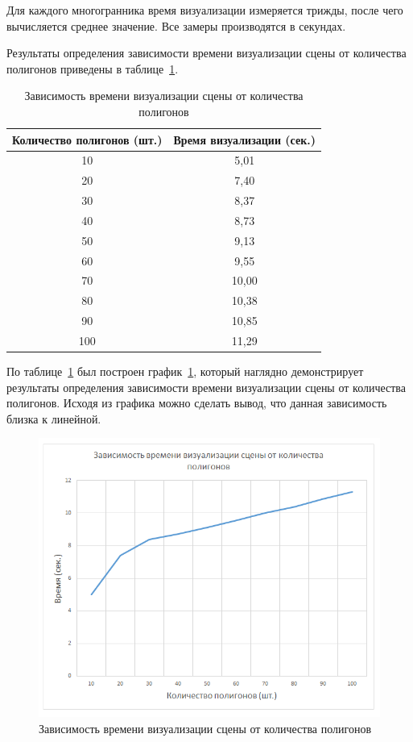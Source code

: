 Для каждого многогранника время визуализации измеряется трижды, после чего вычисляется среднее значение. Все замеры производятся в секундах.

Результаты определения зависимости времени визуализации сцены от количества полигонов приведены в таблице~\ref{tbl:research1}.

\begin{table}[h]
	\centering
	\caption{Зависимость времени визуализации сцены от количества полигонов}
	\begin{tabular}{|c|c|}
		\hline
		\textbf{Количество полигонов (шт.)} & \textbf{Время визуализации (сек.)} \\
		\hline
		10  & 5,01 \\
		20  & 7,40 \\
		30  & 8,37 \\
		40  & 8,73 \\
		50  & 9,13 \\
		60  & 9,55 \\
		70  & 10,00 \\
		80  & 10,38 \\
		90  & 10,85 \\
		100 & 11,29 \\
		\hline
	\end{tabular}
	\label{tbl:research1}
\end{table}

По таблице~\ref{tbl:research1} был построен график~\ref{fig:research1}, который наглядно демонстрирует результаты определения зависимости времени визуализации сцены от количества полигонов. Исходя из графика можно сделать вывод, что данная зависимость близка к линейной.

\clearpage

\begin{figure}[h] 
	\centering
	\includegraphics[width=1\textwidth]{images/research1.png}
	\caption{Зависимость времени визуализации сцены от количества полигонов} 
	\label{fig:research1} 
\end{figure}

